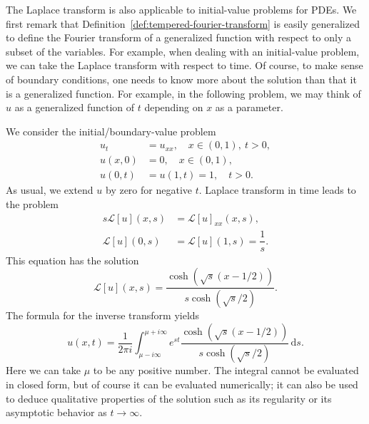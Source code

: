 \begin{Example}
\label{ex:heat-boundary-laplace}
The Laplace transform is also applicable to initial-value problems for PDEs. We first remark that Definition~\ref{def:tempered-fourier-transform} is easily generalized to define the Fourier transform of a generalized function with respect to only a subset of the variables. For example, when dealing with an initial-value problem, we can take the Laplace transform with respect to time. Of course, to make sense of boundary conditions, one needs to know more about the solution than that it is a generalized function. For example, in the following problem, we may think of $u$ as a generalized function of $t$ depending on $x$ as a parameter.

We consider the initial/boundary-value problem
\begin{equation}\label{eq:heat-unit-boundary-zero-initial-problem}
\begin{aligned}
u_t&=u_{xx},\quad x\in(0,1),\ t>0,\\
u(x,0)&=0,\quad x\in(0,1),\\
u(0,t)&=u(1,t)=1,\quad t>0.
\end{aligned}
\end{equation}
As usual, we extend $u$ by zero for negative $t$. Laplace transform in time leads to the problem
\begin{equation}\label{eq:heat-unit-boundary-laplace-problem}
\begin{aligned}
s\mathcal{L}[u](x,s)&=\mathcal{L}[u]_{xx}(x,s),\\
\mathcal{L}[u](0,s)&=\mathcal{L}[u](1,s)=\dfrac1s.
\end{aligned}
\end{equation}
This equation has the solution
\begin{equation}\label{eq:heat-unit-boundary-laplace-solution}
\mathcal{L}[u](x,s)=\dfrac{\cosh(\sqrt s(x-1/2))}{s\cosh(\sqrt s/2)}.
\end{equation}
The formula for the inverse transform yields
\begin{equation}\label{eq:heat-unit-boundary-inverse-laplace-formula}
u(x,t)=\dfrac1{2\pi i}\int_{\mu-i\infty}^{\mu+i\infty}e^{st}\dfrac{\cosh(\sqrt s(x-1/2))}{s\cosh(\sqrt s/2)}\,\mathrm{d}s.
\end{equation}
Here we can take $\mu$ to be any positive number. The integral cannot be evaluated in closed form, but of course it can be evaluated numerically; it can also be used to deduce qualitative properties of the solution such as its regularity or its asymptotic behavior as $t\to\infty$.
\end{Example}
